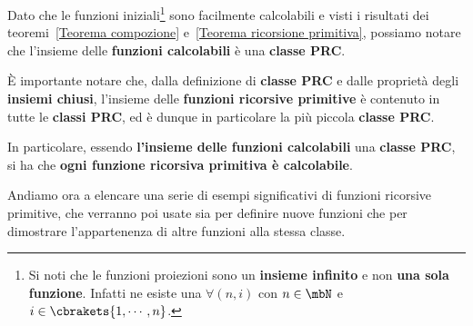 
Dato che le funzioni iniziali\footnote{Si noti che le funzioni proiezioni sono un \textbf{insieme infinito} e non \textbf{una sola funzione}. Infatti ne esiste una \(\forall (n,i)\) con \( n \in \mbN\) e \( i \in \cbrakets{1,\cdots,n}\).} sono facilmente calcolabili e visti i risultati dei teoremi~\ref{Teorema compozione} e~\ref{Teorema ricorsione primitiva}, possiamo notare che l'insieme delle \textbf{funzioni calcolabili} è una \textbf{classe PRC}.


È importante notare che, dalla definizione di \textbf{classe PRC} e dalle proprietà degli \textbf{insiemi chiusi}, l'insieme delle \textbf{funzioni ricorsive primitive} è contenuto in tutte le \textbf{classi PRC}, ed è dunque in particolare la più piccola \textbf{classe PRC}.

In particolare, essendo \textbf{l'insieme delle funzioni calcolabili} una \textbf{classe PRC}, si ha che \textbf{ogni funzione ricorsiva primitiva è calcolabile}.

\newpage
Andiamo ora a elencare una serie di esempi significativi di funzioni ricorsive primitive, che verranno poi usate sia per definire nuove funzioni che per dimostrare l'appartenenza di altre funzioni alla stessa classe.

